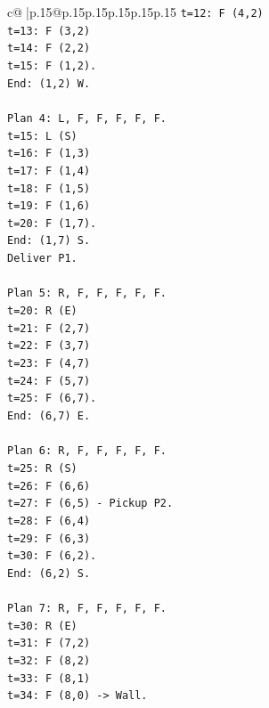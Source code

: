 \documentclass{article}
\begin{document}
{\begin{supertabular}{c@{$\;$}|p{.15\linewidth}@{}p{.15\linewidth}p{.15\linewidth}p{.15\linewidth}p{.15\linewidth}p{.15\linewidth}}
{{{\texttt{t=12: F (4,2)} \\
\texttt{t=13: F (3,2)} \\
\texttt{t=14: F (2,2)} \\
\texttt{t=15: F (1,2).} \\
\texttt{End: (1,2) W.} \\
\\ 
\texttt{Plan 4: L, F, F, F, F, F.} \\
\texttt{t=15: L (S)} \\
\texttt{t=16: F (1,3)} \\
\texttt{t=17: F (1,4)} \\
\texttt{t=18: F (1,5)} \\
\texttt{t=19: F (1,6)} \\
\texttt{t=20: F (1,7).} \\
\texttt{End: (1,7) S.} \\
\texttt{Deliver P1.} \\
\\ 
\texttt{Plan 5: R, F, F, F, F, F.} \\
\texttt{t=20: R (E)} \\
\texttt{t=21: F (2,7)} \\
\texttt{t=22: F (3,7)} \\
\texttt{t=23: F (4,7)} \\
\texttt{t=24: F (5,7)} \\
\texttt{t=25: F (6,7).} \\
\texttt{End: (6,7) E.} \\
\\ 
\texttt{Plan 6: R, F, F, F, F, F.} \\
\texttt{t=25: R (S)} \\
\texttt{t=26: F (6,6)} \\
\texttt{t=27: F (6,5) {-} Pickup P2.} \\
\texttt{t=28: F (6,4)} \\
\texttt{t=29: F (6,3)} \\
\texttt{t=30: F (6,2).} \\
\texttt{End: (6,2) S.} \\
\\ 
\texttt{Plan 7: R, F, F, F, F, F.} \\
\texttt{t=30: R (E)} \\
\texttt{t=31: F (7,2)} \\
\texttt{t=32: F (8,2)} \\
\texttt{t=33: F (8,1)} \\
\texttt{t=34: F (8,0) {-}> Wall.} \\
}}}
\end{supertabular}}
\end{document}

